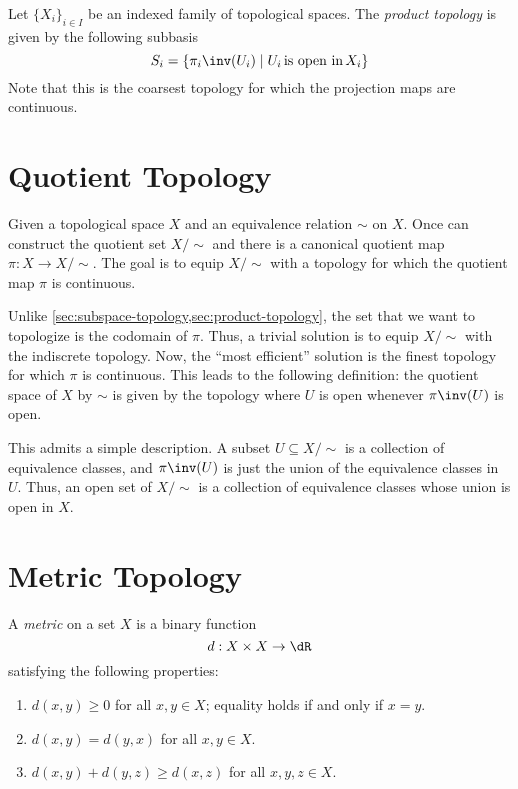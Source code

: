 \documentclass{amsart}
\begin{document}
\begin{defn}
  Let $\{X_{i}\}_{i \in I}$ be an indexed family of topological spaces.
  The \emph{product topology} is given by the following subbasis
  \[
    S_{i} = \{\pi_{i}\inv(U_{i}) \mid U_{i}\,\text{is open in}\,X_{i}\}
  \]
  Note that this is the coarsest topology for which the projection maps are continuous.
\end{defn}

\section{Quotient Topology}
\label{sec:quotient-topology}

Given a topological space $X$ and an equivalence relation $\sim$ on $X$.
Once can construct the quotient set $X/\sim$ and there is a canonical quotient map $\pi : X \to X/\sim$.
The goal is to equip $X/\sim$ with a topology for which the quotient map $\pi$ is continuous.

Unlike \cref{sec:subspace-topology,sec:product-topology}, the set that we want to topologize is the codomain of $\pi$.
Thus, a trivial solution is to equip $X/\sim$ with the indiscrete topology.
Now, the ``most efficient'' solution is the finest topology for which $\pi$ is continuous.
This leads to the following definition: the quotient space of $X$ by $\sim$ is given by the topology where $U$ is open whenever $\pi\inv(U)$ is open.

This admits a simple description.
A subset $U \subseteq X/\sim$ is a collection of equivalence classes, and $\pi\inv(U)$ is just the union of the equivalence classes in $U$.
Thus, an open set of $X/\sim$ is a collection of equivalence classes whose union is open in $X$.

\section{Metric Topology}
\label{sec:metric-topology}

\begin{defn}
  A \emph{metric} on a set $X$ is a binary function
  \[
    d : X \times X \to \dR
  \]
  satisfying the following properties:
  \begin{enumerate}
  \item $d(x,y) \geq 0$ for all $x,y \in X$; equality holds if and only if $x = y$.
  \item $d(x,y) = d(y,x)$ for all $x,y \in X$.
  \item $d(x,y) + d(y,z) \geq d(x,z)$ for all $x,y,z \in X$.
  \end{enumerate}
\end{defn}
\end{document}
